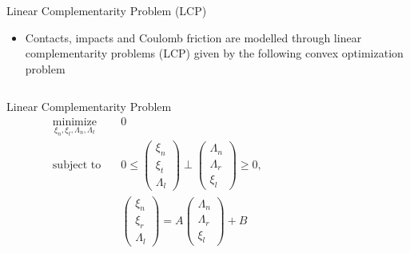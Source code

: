 \begin{frame}{Linear Complementarity Problem (LCP)}
    \begin{itemize}
        \item Contacts, impacts and Coulomb friction are modelled through linear complementarity problems (LCP) given by the following convex optimization problem
    \end{itemize}
    \begin{columns}
        \begin{column}{0.4\linewidth}
            \begin{exampleblock}{Linear Complementarity Problem}
                \small
                \begin{equation*}
                    \begin{aligned}
                        \underset{\xi_n, \xi_t, \Lambda_n, \Lambda_t }{\textrm{minimize}} 
                        &\quad 0 \\
                        \textrm{subject to}
                        &\quad 0 \leq  \begin{pmatrix}
                            \xi_n \\ \xi_t \\ \Lambda_l
                        \end{pmatrix}  \perp  \begin{pmatrix}
                            \Lambda_n \\ \Lambda_r \\ \xi_l
                        \end{pmatrix}  \geq 0,  \\
                        &\quad  \begin{pmatrix}
                            \xi_n \\ \xi_r \\ \Lambda_l
                        \end{pmatrix}  = A  \begin{pmatrix}
                            \Lambda_n \\ \Lambda_r \\ \xi_l
                        \end{pmatrix}  + B 
                    \end{aligned} 
                \end{equation*}
              \end{exampleblock}
        \end{column}
        \begin{column}[]{0.5\linewidth}

\end{column}
\end{columns}
\end{frame}
